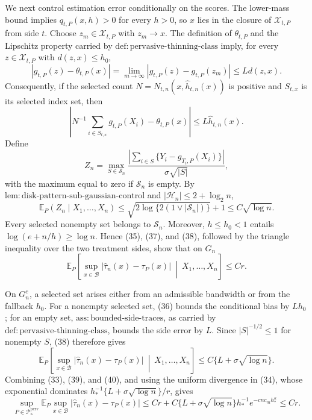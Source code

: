 We next control estimation error conditionally on the scores.  The lower-mass bound implies \(q_{t,P}(x,h)>0\) for every \(h>0\), so \(x\) lies in the closure of \(\mathcal X_{t,P}\) from side \(t\).  Choose \(z_m\in\mathcal X_{t,P}\) with \(z_m\to x\).  The definition of \(\theta_{t,P}\) and the Lipschitz property carried by \(\mathrm{def:pervasive\text{-}thinning\text{-}class}\) imply, for every \(z\in\mathcal X_{t,P}\) with \(d(z,x)\le h_0\),
\[
 |g_{t,P}(z)-\theta_{t,P}(x)|
 =\lim_{m\to\infty}|g_{t,P}(z)-g_{t,P}(z_m)|
 \le Ld(z,x). \tag{36}
\]
Consequently, if the selected count \(N=N_{t,n}(x,\widehat h_{t,n}(x))\) is positive and \(S_{t,x}\) is its selected index set, then
\[
 \left|N^{-1}\sum_{i\in S_{t,x}}g_{t,P}(X_i)-\theta_{t,P}(x)\right|
 \le L\widehat h_{t,n}(x). \tag{37}
\]
Define
\[
 Z_n=\max_{S\in\mathscr S_n}
 \frac{\left|\sum_{i\in S}\{Y_i-g_{T_i,P}(X_i)\}\right|}
 {\sigma\sqrt{|S|}},
\]
with the maximum equal to zero if \(\mathscr S_n\) is empty.  By \(\mathrm{lem:disk\text{-}pattern\text{-}sub\text{-}gaussian\text{-}control}\) and \(|\mathcal H_n|\le2+\log_2n\),
\[
 \mathbb E_P(Z_n\mid X_1,\ldots,X_n)
 \le\sqrt{2\log\{2(1\vee|\mathscr S_n|)\}}+1
 \le C\sqrt{\log n}. \tag{38}
\]
Every selected nonempty set belongs to \(\mathscr S_n\).  Moreover, \(h\le h_0<1\) entails \(\log(e+n/h)\ge\log n\).  Hence (35), (37), and (38), followed by the triangle inequality over the two treatment sides, show that on \(G_n\)
\[
 \mathbb E_P\left[\sup_{x\in\mathcal B}
 |\widehat\tau_n(x)-\tau_P(x)|\ \middle|\ X_1,\ldots,X_n\right]
 \le Cr. \tag{39}
\]

On \(G_n^c\), a selected set arises either from an admissible bandwidth or from the fallback \(h_0\).  For a nonempty selected set, (36) bounds the conditional bias by \(Lh_0\); for an empty set, \(\mathrm{ass:bounded\text{-}side\text{-}traces}\), as carried by \(\mathrm{def:pervasive\text{-}thinning\text{-}class}\), bounds the side error by \(L\).  Since \(|S|^{-1/2}\le1\) for nonempty \(S\), (38) therefore gives
\[
 \mathbb E_P\left[\sup_{x\in\mathcal B}
 |\widehat\tau_n(x)-\tau_P(x)|\ \middle|\ X_1,\ldots,X_n\right]
 \le C\{L+\sigma\sqrt{\log n}\}. \tag{40}
\]
Combining (33), (39), and (40), and using the uniform divergence in (34), whose exponential dominates \(h_*^{-1}\{L+\sigma\sqrt{\log n}\}/r\), gives
\[
 \sup_{P\in\mathcal P_{\kappa}^{\mathrm{perv}}}
 \mathbb E_P\sup_{x\in\mathcal B}|\widehat\tau_n(x)-\tau_P(x)|
 \le Cr+C\{L+\sigma\sqrt{\log n}\}h_*^{-1}
 e^{-c n c_mh_*^{\kappa}}
 \le Cr. \tag{41}
\]

